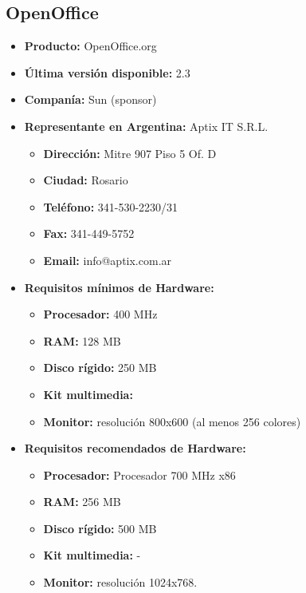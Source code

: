 \subsection{OpenOffice}

\begin{itemize}
  \item \textbf{Producto:} OpenOffice.org
  \item \textbf{Última versión disponible:} 2.3
  \item \textbf{Companía:} Sun (sponsor)

  \item \textbf{Representante en Argentina:} Aptix IT S.R.L.
    \begin{itemize}
      \item \textbf{Dirección:} Mitre 907 Piso 5 Of. D
      \item \textbf{Ciudad:} Rosario
      \item \textbf{Teléfono:} 341-530-2230/31
      \item \textbf{Fax:} 341-449-5752
      \item \textbf{Email:} info@aptix.com.ar
    \end{itemize}

  \item \textbf{Requisitos mínimos de Hardware:}
    \begin{itemize}
      \item \textbf{Procesador:} 400 MHz
      \item \textbf{RAM:} 128 MB
      \item \textbf{Disco rígido:} 250 MB
      \item \textbf{Kit multimedia:}
      \item \textbf{Monitor:} resolución 800x600 (al menos 256 colores)
    \end{itemize}

  \item \textbf{Requisitos recomendados de Hardware:}
    \begin{itemize}
      \item \textbf{Procesador:} Procesador 700 MHz x86
      \item \textbf{RAM:} 256 MB
      \item \textbf{Disco rígido:} 500 MB
      \item \textbf{Kit multimedia:} -
      \item \textbf{Monitor:} resolución 1024x768.
    \end{itemize}


\end{itemize}
